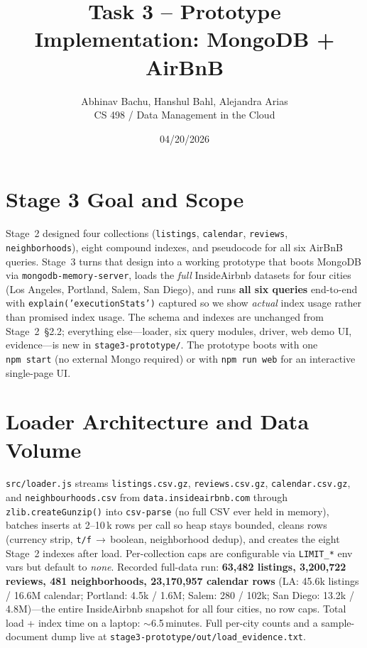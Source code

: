 \documentclass[10pt]{article}
\title{\vspace{-2.0em}Task 3 -- Prototype Implementation: MongoDB + AirBnB\vspace{-0.4em}}
\author{Abhinav Bachu, Hanshul Bahl, Alejandra Arias\\CS 498 / Data Management in the Cloud}
\date{04/20/2026}
\begin{document}
\maketitle
\vspace{-2.0em}

\section{Stage 3 Goal and Scope}

Stage~2 designed four collections (\texttt{listings}, \texttt{calendar}, \texttt{reviews}, \texttt{neighborhoods}), eight compound indexes, and pseudocode for all six AirBnB queries. Stage~3 turns that design into a working prototype that boots MongoDB via \texttt{mongodb-memory-server}, loads the \emph{full} InsideAirbnb datasets for four cities (Los Angeles, Portland, Salem, San Diego), and runs \textbf{all six queries} end-to-end with \texttt{explain('executionStats')} captured so we show \emph{actual} index usage rather than promised index usage. The schema and indexes are unchanged from Stage~2~\S2.2; everything else---loader, six query modules, driver, web demo UI, evidence---is new in \texttt{stage3-prototype/}. The prototype boots with one \texttt{npm~start} (no external Mongo required) or with \texttt{npm~run~web} for an interactive single-page UI.

\section{Loader Architecture and Data Volume}

\texttt{src/loader.js} streams \texttt{listings.csv.gz}, \texttt{reviews.csv.gz}, \texttt{calendar.csv.gz}, and \texttt{neighbourhoods.csv} from \texttt{data.insideairbnb.com} through \texttt{zlib.createGunzip()} into \texttt{csv-parse} (no full CSV ever held in memory), batches inserts at 2--10\,k rows per call so heap stays bounded, cleans rows (currency strip, \texttt{t/f}\,$\to$\,boolean, neighborhood dedup), and creates the eight Stage~2 indexes after load. Per-collection caps are configurable via \texttt{LIMIT\_*} env vars but default to \emph{none}. Recorded full-data run: \textbf{63{,}482 listings, 3{,}200{,}722 reviews, 481 neighborhoods, 23{,}170{,}957 calendar rows} (LA: 45.6k listings / 16.6M calendar; Portland: 4.5k / 1.6M; Salem: 280 / 102k; San Diego: 13.2k / 4.8M)---the entire InsideAirbnb snapshot for all four cities, no row caps. Total load + index time on a laptop: $\sim$6.5\,minutes. Full per-city counts and a sample-document dump live at \texttt{stage3-prototype/out/load\_evidence.txt}.
\end{document}
